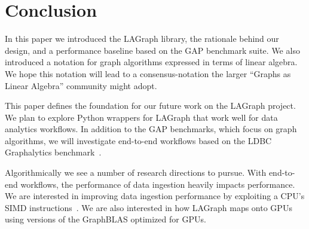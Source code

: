 \section{Conclusion}
\label{sec:conclusion}

In this paper we introduced the LAGraph library, the rationale behind our design,  
and a performance baseline based on the GAP benchmark suite.   We also introduced
a notation for graph algorithms expressed in terms of linear algebra.  We hope this
notation will lead to a consensus-notation the 
larger ``Graphs as Linear Algebra'' community might adopt.

This paper defines the foundation for our future work on the LAGraph project.  
We plan to explore Python wrappers for LAGraph that work well for data analytics workflows.  
In addition to the GAP benchmarks, which focus on graph algorithms, we will  
investigate end-to-end workflows based on the LDBC Graphalytics benchmark~\cite{DBLP:journals/pvldb/IosupHNHPMCCSAT16}.

Algorithmically we see a number of research directions to pursue.   With end-to-end workflows, the performance
of data ingestion heavily impacts performance.  We are interested in improving data ingestion performance
by exploiting a CPU's SIMD instructions~\cite{DBLP:journals/vldb/LangdaleL19}.  We are also interested in how  
LAGraph maps onto GPUs using versions of the GraphBLAS optimized for GPUs.